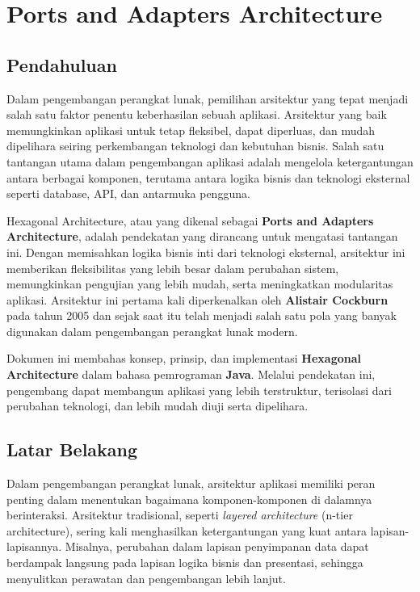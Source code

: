 \chapter{Ports and Adapters Architecture}

\section{Pendahuluan}

Dalam pengembangan perangkat lunak, pemilihan arsitektur yang tepat menjadi salah satu faktor penentu keberhasilan sebuah aplikasi. Arsitektur yang baik memungkinkan aplikasi untuk tetap fleksibel, dapat diperluas, dan mudah dipelihara seiring perkembangan teknologi dan kebutuhan bisnis. Salah satu tantangan utama dalam pengembangan aplikasi adalah mengelola ketergantungan antara berbagai komponen, terutama antara logika bisnis dan teknologi eksternal seperti database, API, dan antarmuka pengguna.

Hexagonal Architecture, atau yang dikenal sebagai \textbf{Ports and Adapters Architecture}, adalah pendekatan yang dirancang untuk mengatasi tantangan ini. Dengan memisahkan logika bisnis inti dari teknologi eksternal, arsitektur ini memberikan fleksibilitas yang lebih besar dalam perubahan sistem, memungkinkan pengujian yang lebih mudah, serta meningkatkan modularitas aplikasi. Arsitektur ini pertama kali diperkenalkan oleh \textbf{Alistair Cockburn} pada tahun 2005 dan sejak saat itu telah menjadi salah satu pola yang banyak digunakan dalam pengembangan perangkat lunak modern.

Dokumen ini membahas konsep, prinsip, dan implementasi \textbf{Hexagonal Architecture} dalam bahasa pemrograman \textbf{Java}. Melalui pendekatan ini, pengembang dapat membangun aplikasi yang lebih terstruktur, terisolasi dari perubahan teknologi, dan lebih mudah diuji serta dipelihara.

\section{Latar Belakang}

Dalam pengembangan perangkat lunak, arsitektur aplikasi memiliki peran penting dalam menentukan bagaimana komponen-komponen di dalamnya berinteraksi. Arsitektur tradisional, seperti \textit{layered architecture} (n-tier architecture), sering kali menghasilkan ketergantungan yang kuat antara lapisan-lapisannya. Misalnya, perubahan dalam lapisan penyimpanan data dapat berdampak langsung pada lapisan logika bisnis dan presentasi, sehingga menyulitkan perawatan dan pengembangan lebih lanjut.

